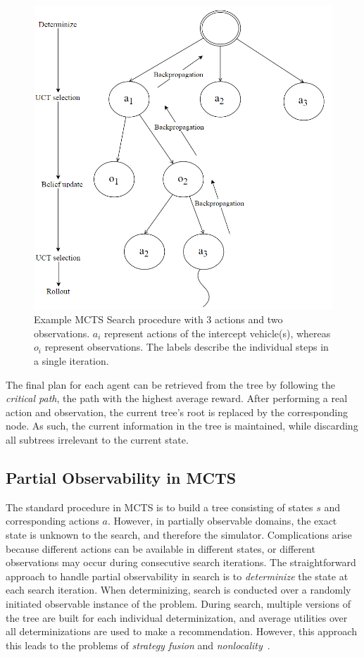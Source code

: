 \documentclass[conference]{IEEEtran}
\begin{document}
\begin{figure}
\begin{center}
 \includegraphics[width=.44\textwidth]{img/searchtree.png}
 \caption{Example MCTS Search procedure with 3 actions and two observations. $a_i$ represent actions of the intercept vehicle(s), whereas $o_i$ represent observations. The labels describe the individual steps in a single iteration.}\label{fig:searchtree}
\end{center}
\end{figure}

The final plan for each agent can be retrieved from the tree by following the \emph{critical path}, \ie the path with the highest average reward. After performing a real action and observation, the current tree's root is replaced by the corresponding node. As such, the current information in the tree is maintained, while discarding all subtrees irrelevant to the current state.

\subsection{Partial Observability in MCTS}
\label{sub:pomcts}

The standard procedure in MCTS is to build a tree consisting of states $s$ and corresponding actions $a$. However, in partially observable domains, the exact state is unknown to the search, and therefore the simulator. Complications arise because different actions can be available in different states, or different observations may occur during consecutive search iterations. The straightforward approach to handle partial observability in search is to \emph{determinize} the state at each search iteration. When determinizing, search is conducted over a randomly initiated observable instance of the problem. During search, multiple versions of the tree are built for each individual determinization, and average utilities over all determinizations are used to make a recommendation. However, this approach this leads to the problems of \emph{strategy fusion} and \emph{nonlocality}~\cite{cowling2012information}.
\end{document}
